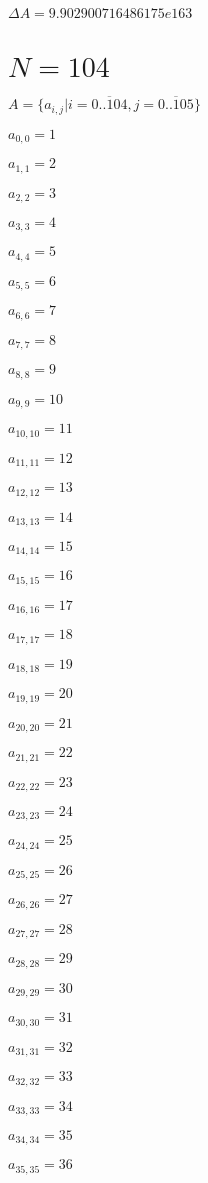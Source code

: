 \documentclass[a4paper,12pt]{article}
\begin{document}
$\Delta A = 9.902900716486175e163$



\section{ $N = 104$ }
$A = \{ a _{ i, j } | i = \overline { 0..104 }, j = \overline { 0..105 } \}$

$a _{ 0, 0 } = 1$

$a _{ 1, 1 } = 2$

$a _{ 2, 2 } = 3$

$a _{ 3, 3 } = 4$

$a _{ 4, 4 } = 5$

$a _{ 5, 5 } = 6$

$a _{ 6, 6 } = 7$

$a _{ 7, 7 } = 8$

$a _{ 8, 8 } = 9$

$a _{ 9, 9 } = 10$

$a _{ 10, 10 } = 11$

$a _{ 11, 11 } = 12$

$a _{ 12, 12 } = 13$

$a _{ 13, 13 } = 14$

$a _{ 14, 14 } = 15$

$a _{ 15, 15 } = 16$

$a _{ 16, 16 } = 17$

$a _{ 17, 17 } = 18$

$a _{ 18, 18 } = 19$

$a _{ 19, 19 } = 20$

$a _{ 20, 20 } = 21$

$a _{ 21, 21 } = 22$

$a _{ 22, 22 } = 23$

$a _{ 23, 23 } = 24$

$a _{ 24, 24 } = 25$

$a _{ 25, 25 } = 26$

$a _{ 26, 26 } = 27$

$a _{ 27, 27 } = 28$

$a _{ 28, 28 } = 29$

$a _{ 29, 29 } = 30$

$a _{ 30, 30 } = 31$

$a _{ 31, 31 } = 32$

$a _{ 32, 32 } = 33$

$a _{ 33, 33 } = 34$

$a _{ 34, 34 } = 35$

$a _{ 35, 35 } = 36$
\end{document}
